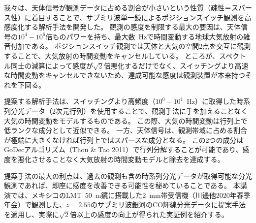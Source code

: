 \documentclass[ja]{2020b}
\begin{document}

我々は、天体信号が観測データに占める割合が小さいという性質（疎性＝スパース性）に着目することで、サブミリ波単一鏡によるポジションスイッチ観測を高感度化する解析手法を開発した。
観測の感度を制限する最大の要因は、天体信号の$10^{4}-10^{6}$倍ものパワーを持ち、最大数~Hzで時間変動する地球大気放射の雑音付加である。
ポジションスイッチ観測では天体と大気の空間2点を交互に観測することで、大気放射の時間変動をキャンセルしている。
ところが、スペクトル同士の減算によって感度が$\sqrt{2}$倍悪化するだけでなく、スイッチングより高速な時間変動をキャンセルできないため、達成可能な感度は観測装置が本来持つそれを下回る。

提案する解析手法は、スイッチングより高頻度（$10^{0}-10^{1}$~Hz）に取得した時系列分光データ（2次元行列）を使用することで、観測手法に手を加えることなく大気の時間変動をモデルするものである。
この際、大気の時間変動は行列上で低ランクな成分として近似できる。
一方、天体信号は、観測帯域に占める割合が極端に大きくなければ行列上ではスパースな成分となる。
この2つの成分はGoDecアルゴリズム（Thou \& Tao 2011）で行列分解することが可能であり、感度を悪化させることなく大気放射の時間変動モデルと除去を達成する。

提案手法の最大の利点は、過去の観測も含め時系列分光データが取得可能な分光観測であれば、即座に感度を改善できる可能性を秘めていることである。
本講演では、メキシコのLMT~50~m鏡に搭載した2~mm帯受信機（川邊他2020年春季年会）で観測した、$z=2.55$のサブミリ波銀河のCO輝線分光データに提案手法を適用し、実際に$\sqrt{2}$倍以上の感度の向上が得られた実証例を紹介する。

\end{document}
